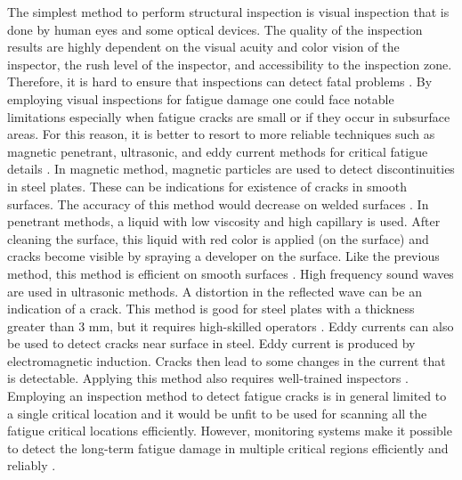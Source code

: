 The simplest method to perform structural inspection is visual inspection that is done by human eyes and some optical devices. 
The quality of the inspection results are highly dependent on the visual acuity and color vision of the inspector, the rush level of the inspector, and accessibility to the inspection zone. Therefore, 
it is hard to ensure that inspections can detect fatal problems \citep{Swartz2009DamageCO}. By employing visual inspections for fatigue damage one could face notable limitations especially when fatigue cracks 
are small or if they occur in subsurface areas. For this reason, it is better to resort to more reliable techniques such as magnetic penetrant, ultrasonic, and 
eddy current methods for critical fatigue details  \citep{Fisher1998, Moan2005, Ciang2008}. In magnetic method, magnetic particles are used to detect discontinuities in steel plates. These can be  
indications for existence of 
cracks in smooth surfaces. The accuracy of this method would decrease on welded surfaces \citep{Demsetz1996}. In penetrant methods, a liquid with low viscosity and high capillary is used. After 
cleaning the surface, this liquid with red color is applied (on the surface) and cracks become visible by spraying a developer on the surface. Like the previous method, this method is efficient on 
smooth surfaces \citep{Fisher1998}. High frequency sound waves are used in ultrasonic methods. A distortion in the reflected wave can be an indication of a crack. This method is good for steel plates 
with a thickness greater than 3 mm, but it requires high-skilled operators \citep{SOLIMAN201691}. Eddy currents can also be used to detect cracks near surface in steel. Eddy current is produced by 
electromagnetic induction. Cracks then lead to some changes in the current that is detectable. Applying this method also requires well-trained inspectors \citep{Hellier2012, Demsetz1996}. 
Employing an inspection method to detect fatigue cracks is in general limited to a single critical location and it would be unfit to be used for scanning all the fatigue critical locations efficiently.
However, monitoring systems make it possible to detect the long-term fatigue damage in multiple critical regions efficiently and reliably \citep{ANTONACI201226}. 

